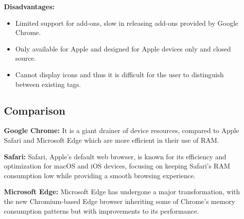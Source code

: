\documentclass[a4paper,12pt]{article}
\begin{document}
\textbf{Disadvantages:}
\begin{itemize}
    \item Limited support for add-ons, slow in releasing add-ons provided by Google Chrome.
    \item Only available for Apple and designed for Apple devices only and closed source.
    \item Cannot display icons and thus it is difficult for the user to distinguish between existing tags.
\end{itemize}

\subsection{Comparison}
\textbf{Google Chrome:} It is a giant drainer of device resources, compared to Apple Safari and Microsoft Edge which are more efficient in their use of RAM.

\textbf{Safari:} Safari, Apple’s default web browser, is known for its efficiency and optimization for macOS and iOS devices, focusing on keeping Safari’s RAM consumption low while providing a smooth browsing experience.

\textbf{Microsoft Edge:} Microsoft Edge has undergone a major transformation, with the new Chromium-based Edge browser inheriting some of Chrome’s memory consumption patterns but with improvements to its performance.
\end{document}
